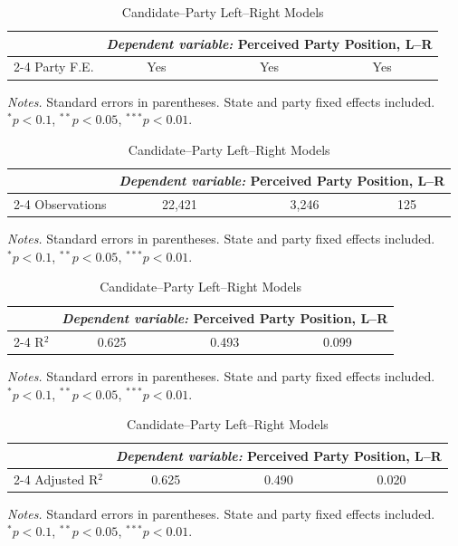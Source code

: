 \begin{table}[!htbp]\centering
\caption{Candidate--Party Left--Right Models}
\label{tab:cand_party_lr}
\begin{tabular}{lccc}
\toprule
 & \multicolumn{3}{c}{\textit{Dependent variable:} Perceived Party Position, L--R} \\
\cmidrule(lr){2-4}
Party F.E. & Yes & Yes & Yes \\ \bottomrule
\end{tabular}
\vspace{0.2em}
{\footnotesize \textit{Notes.} Standard errors in parentheses. State and party fixed effects included. \\$^{*}p<0.1$, $^{**}p<0.05$, $^{***}p<0.01$.}
\end{table}

\begin{table}[!htbp]\centering
\caption{Candidate--Party Left--Right Models}
\label{tab:cand_party_lr}
\begin{tabular}{lccc}
\toprule
 & \multicolumn{3}{c}{\textit{Dependent variable:} Perceived Party Position, L--R} \\
\cmidrule(lr){2-4}
Observations & 22,421 & 3,246 & 125 \\ \bottomrule
\end{tabular}
\vspace{0.2em}
{\footnotesize \textit{Notes.} Standard errors in parentheses. State and party fixed effects included. \\$^{*}p<0.1$, $^{**}p<0.05$, $^{***}p<0.01$.}
\end{table}

\begin{table}[!htbp]\centering
\caption{Candidate--Party Left--Right Models}
\label{tab:cand_party_lr}
\begin{tabular}{lccc}
\toprule
 & \multicolumn{3}{c}{\textit{Dependent variable:} Perceived Party Position, L--R} \\
\cmidrule(lr){2-4}
R$^{2}$ & 0.625 & 0.493 & 0.099 \\ \bottomrule
\end{tabular}
\vspace{0.2em}
{\footnotesize \textit{Notes.} Standard errors in parentheses. State and party fixed effects included. \\$^{*}p<0.1$, $^{**}p<0.05$, $^{***}p<0.01$.}
\end{table}

\begin{table}[!htbp]\centering
\caption{Candidate--Party Left--Right Models}
\label{tab:cand_party_lr}
\begin{tabular}{lccc}
\toprule
 & \multicolumn{3}{c}{\textit{Dependent variable:} Perceived Party Position, L--R} \\
\cmidrule(lr){2-4}
Adjusted R$^{2}$ & 0.625 & 0.490 & 0.020 \\ \bottomrule
\end{tabular}
\vspace{0.2em}
{\footnotesize \textit{Notes.} Standard errors in parentheses. State and party fixed effects included. \\$^{*}p<0.1$, $^{**}p<0.05$, $^{***}p<0.01$.}
\end{table}

